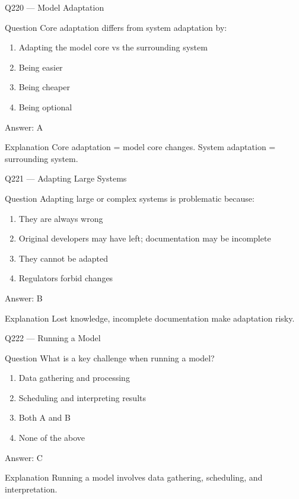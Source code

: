 \documentclass[aspectratio=169,8pt]{beamer}
\begin{document}
\begin{frame}{Q220 --- Model Adaptation}
\begin{block}{Question}
Core adaptation differs from system adaptation by:
\begin{enumerate}
\item Adapting the model core vs the surrounding system
\item Being easier
\item Being cheaper
\item Being optional
\end{enumerate}
\end{block}
\begin{exampleblock}{Answer: A}\end{exampleblock}
\begin{block}{Explanation}
Core adaptation = model core changes. System adaptation = surrounding system.
\end{block}
\end{frame}

\begin{frame}{Q221 --- Adapting Large Systems}
\begin{block}{Question}
Adapting large or complex systems is problematic because:
\begin{enumerate}
\item They are always wrong
\item Original developers may have left; documentation may be incomplete
\item They cannot be adapted
\item Regulators forbid changes
\end{enumerate}
\end{block}
\begin{exampleblock}{Answer: B}\end{exampleblock}
\begin{block}{Explanation}
Lost knowledge, incomplete documentation make adaptation risky.
\end{block}
\end{frame}

\begin{frame}{Q222 --- Running a Model}
\begin{block}{Question}
What is a key challenge when running a model?
\begin{enumerate}
\item Data gathering and processing
\item Scheduling and interpreting results
\item Both A and B
\item None of the above
\end{enumerate}
\end{block}
\begin{exampleblock}{Answer: C}\end{exampleblock}
\begin{block}{Explanation}
Running a model involves data gathering, scheduling, and interpretation.
\end{block}
\end{frame}
\end{document}
